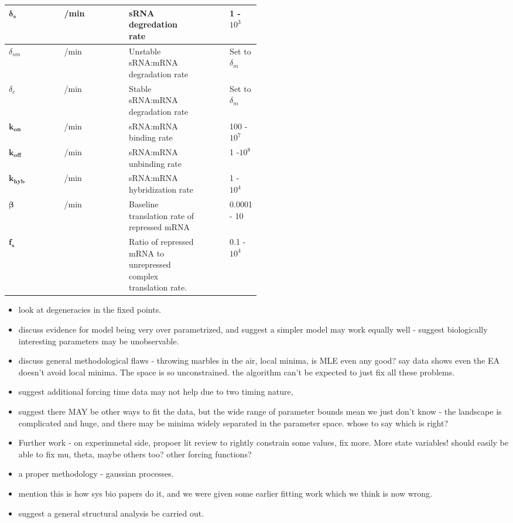 \documentclass[10pt,journal]{./IEEE_latex_class/IEEEtran}
\begin{document}
\begin{table}[H]
\begin{tabular}{| l | l | p{0.3\linewidth} | p{0.1\linewidth} | p{0.1\linewidth} |}
\hline $\boldsymbol{\delta_{s}}$ &  /min & sRNA degredation rate & & 1 - $10^3$ \\
\hline $\delta_{sm}$ &  /min & Unstable sRNA:mRNA degradation rate & &  Set to $\delta_m$\\
\hline $\delta_{c}$ &  /min & Stable sRNA:mRNA degradation rate & & Set to $\delta_m$ \\
\hline $\boldsymbol{k_{on}}$ &   /min & sRNA:mRNA binding rate & & 100 - $10^7$\\
\hline $\boldsymbol{k_{off}}$ &  /min & sRNA:mRNA unbinding rate & & 1 -$10^8$\\
\hline $\boldsymbol{k_{hyb}}$ &  /min & sRNA:mRNA hybridization rate & & 1 - $10^4$ \\
\hline $\boldsymbol{\beta}$ &   /min & Baseline translation rate of repressed mRNA & & 0.0001 - 10\\
\hline $\boldsymbol{f_{s}}$ & & Ratio of repressed mRNA to unrepressed complex translation rate. & & 0.1 - $10^4$\\
\hline
\end{tabular}
\end{table}

 
 \begin{itemize}
 \item look at degeneracies in the fixed points.
 \item discuss evidence for model being very over parametrized, and suggest a simpler model may work equally well - suggest biologically interesting parameters may be unobservable.
 \item discuss general methodological flaws - throwing marbles in the air, local minima, is MLE even any good? say data shows even the EA doesn't avoid local minima. The space is so unconstrained. the algorithm can't be expected to just fix all these problems.
 \item suggest additional forcing time data may not help due to two timing nature, 
 \item suggest there MAY be other ways to fit the data, but the wide range of parameter bounds mean we just don't know - the landscape is complicated and huge, and there may be minima widely separated in the parameter space. whose to say which is right?
 \item Further work - on experimnetal side, propoer lit review to rightly constrain some values, fix more. More state variables! should easily be able to fix mu, theta, maybe others too? other forcing functions?
 \item a proper methodology - gaussian processes.
 \item mention this is how sys bio papers do it, and we were given some earlier fitting work which we think is now wrong.
 \item suggest a general structural analysis be carried out.
 
 \end{itemize}
 
\end{document}
